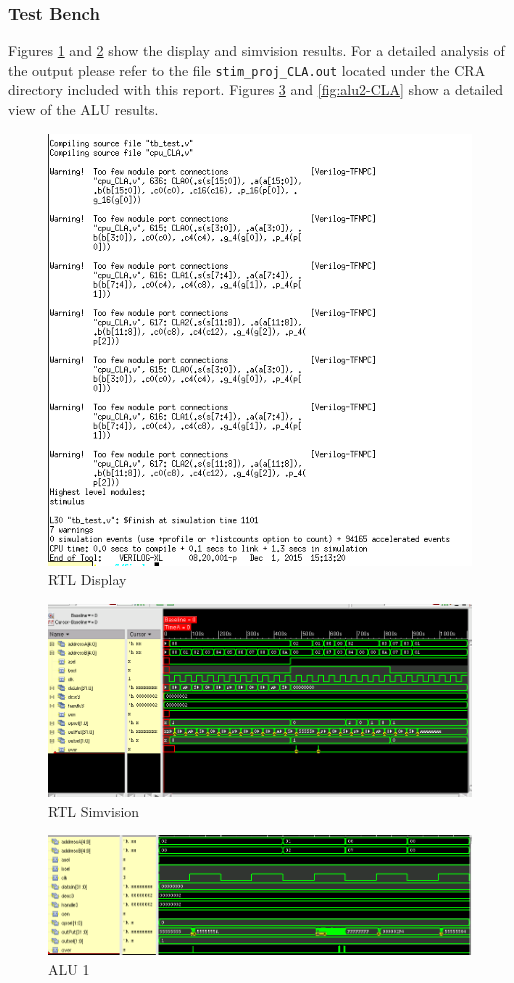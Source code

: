 \documentclass[12pt]{article}
\begin{document}
\subsubsection{Test Bench}
Figures \ref{fig:test-text-CLA} and \ref{fig:test-test-CLA} show the display and simvision results. For a detailed analysis of the output please refer to the file \texttt{stim\_proj\_CLA.out} located under the CRA directory included with this report. Figures  \ref{fig:alu1-CLA} and \ref{fig:alu2-CLA} show a detailed view of the ALU results.
\begin{figure}[H]
\centering
\includegraphics[width=.7\linewidth]{../CLA/test-text}
\caption{RTL Display}
\label{fig:test-text-CLA}
\end{figure}


\begin{figure}[H]
\centering
\includegraphics[width=\linewidth]{../CLA/test-test}
\caption{RTL Simvision}
\label{fig:test-test-CLA}
\end{figure}

\begin{figure}[H]
\centering
\includegraphics[width=\linewidth]{../CLA/alu1}
\caption{ALU 1}
\label{fig:alu1-CLA}
\end{figure}
\end{document}
